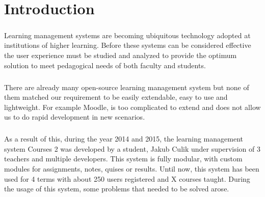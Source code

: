 \chapter*{Introduction}

\paragraph{}
Learning management systems are becoming ubiquitous technology adopted at institutions of higher learning. Before these systems can be considered effective the user experience must be studied and analyzed to provide the optimum solution to meet pedagogical needs of both faculty and students. \cite{machado2007blackboard}

\paragraph{}
There are already many open-source learning management system but none of them matched our requirement to be easily extendable, easy to use and lightweight. For example Moodle, is too complicated to extend and does not allow us to do rapid development in new scenarios.

\paragraph{}
As a result of this, during the year 2014 and 2015, the learning management system Courses 2 was developed by a student, Jakub Culik under supervision of 3 teachers and multiple developers. This system is fully modular, with custom modules for assignments, notes, quises or results. Until now, this system has been used for 4 terms with about 250 users registered and X courses taught. During the usage of this system, some problems that needed to be solved arose.
